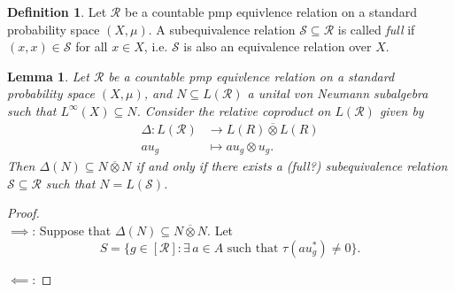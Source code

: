 \documentclass[12pt,letterpaper]{article}
\newcommand{\sub}{\subseteq}
\newcommand*\cls[1]{\overline{#1}}
\theoremstyle{definition}
\newtheorem{definition}{Definition}[]
\theoremstyle{plain}
\newtheorem{lemma}{Lemma}[]
\theoremstyle{remark}
\begin{document}
\begin{definition}
    Let $ \mathcal{R} $ be a countable pmp equivlence relation on a standard probability space $ (X,\mu) $. A subequivalence relation $ \mathcal{S}\sub \mathcal{R} $ is called \textit{full} if $ (x,x)\in \mathcal{S} $ for all $ x\in X $, i.e. $ \mathcal{S} $ is also an equivalence relation over $ X $.
\end{definition}

\begin{lemma}
    Let $ \mathcal{R} $ be a countable pmp equivlence relation on a standard probability space $ (X,\mu) $, and $ N\sub L(\mathcal{R}) $ a unital von Neumann subalgebra such that $ L^{\infty}(X)\sub N $. Consider the relative coproduct on $ L(\mathcal{R}) $ given by
    \begin{align*}
        \Delta : L(\mathcal{R})&\to L(R)\cls{\otimes}L(R)\\
        au_{g} &\mapsto au_{g}\otimes u_{g}.
    \end{align*}
    Then $ \Delta (N)\sub N \cls{\otimes} N $ if and only if there exists a (full?) subequivalence relation $ \mathcal{S}\sub \mathcal{R} $ such that $ N = L(\mathcal{S}) $.
\end{lemma}

\begin{proof}\ \\
    \underline{$ \implies $}: Suppose that $ \Delta(N)\sub N \cls{\otimes} N $. Let 
    \[
        S = \{g\in [\mathcal{R}]: \exists\, a\in A \text{ such that } \tau(au_{g}^{*}) \neq 0\}.
    \]

    \underline{$ \impliedby $}: 
    
\end{proof}
\end{document}

